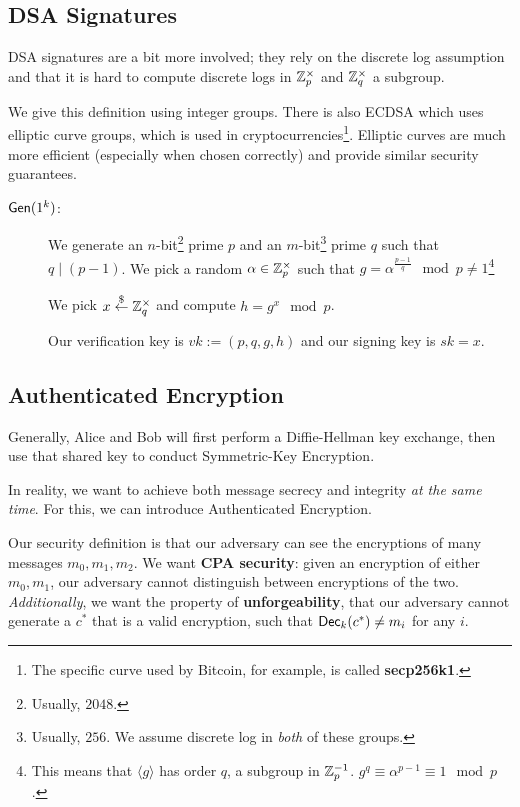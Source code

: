 \subsection{DSA Signatures}
DSA signatures are a bit more involved; they rely on the discrete log assumption and that it is hard to compute discrete logs in $\mathbb Z_p^\times$ and $\mathbb Z_q^\times$ a subgroup.

We give this definition using integer groups. There is also ECDSA which uses elliptic curve groups, which is used in cryptocurrencies\footnote{The specific curve used by Bitcoin, for example, is called \textbf{secp256k1}.}. Elliptic curves are much more efficient (especially when chosen correctly) and provide similar security guarantees.

\begin{description}
    \item[$\operatorname{\mathsf{Gen}}(1^k)$:] We generate an $n$-bit\footnote{Usually, $2048$.} prime $p$ and an $m$-bit\footnote{Usually, $256$. We assume discrete log in \emph{both} of these groups.} prime $q$ such that $q\mid (p-1)$. We pick a random $\alpha\in\mathbb Z_p^\times$ such that $g = \alpha^{\frac{p-1}{q}}\mod{p}\neq 1$\footnote{This means that $\langle g\rangle$ has order $q$, a subgroup in $\mathbb Z_p^{-1}$. $g^q \equiv \alpha^{p-1}\equiv 1\mod{p}$. }

        We pick $x\overset{\$}{\leftarrow} \mathbb Z_q^\times$ and compute $h = g^x\mod{p}$.

        Our verification key is $vk := (p, q, g, h)$ and our signing key is $sk = x$.

\end{description}

\subsection{Authenticated Encryption}
Generally, Alice and Bob will first perform a Diffie-Hellman key exchange, then use that shared key to conduct Symmetric-Key Encryption.


In reality, we want to achieve both message secrecy and integrity \emph{at the same time}. For this, we can introduce Authenticated Encryption.

Our security definition is that our adversary can see the encryptions of many messages $m_0, m_1, m_2$. We want \textbf{CPA security}: given an encryption of either $m_0, m_1$, our adversary cannot distinguish between encryptions of the two. \emph{Additionally}, we want the property of \textbf{unforgeability}, that our adversary cannot generate a $c^*$ that is a valid encryption, such that $\operatorname{\mathsf{Dec}}_{k}(c^*)\neq m_i$ for any $i$.

